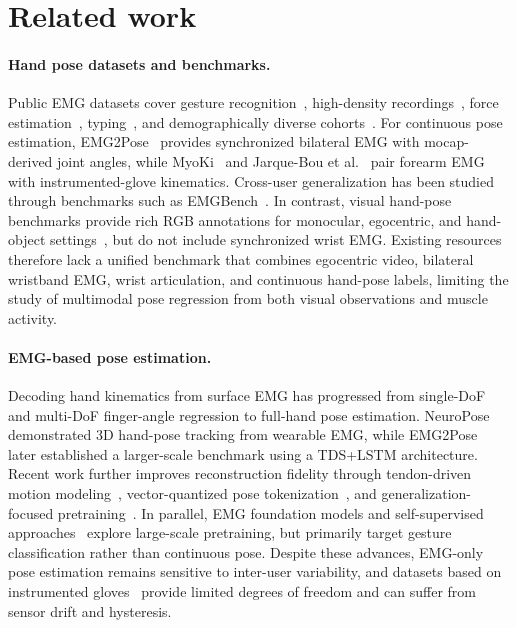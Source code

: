 \documentclass{article}
\begin{document}
\section{Related work}

\paragraph{Hand pose datasets and benchmarks.}
Public EMG datasets cover gesture recognition~\citep{ninapro,grabmyo,putemg,du2017surface,amma2015advancing}, high-density recordings~\citep{jiang2021open}, force estimation~\citep{pimforce}, typing~\citep{emg2qwerty}, and demographically diverse cohorts~\citep{gowda2025database}. For continuous pose estimation, EMG2Pose~\citep{emg2pose} provides synchronized bilateral EMG with mocap-derived joint angles, while MyoKi~\citep{myoki} and Jarque-Bou et al.~\citep{jarque2019} pair forearm EMG with instrumented-glove kinematics. Cross-user generalization has been studied through benchmarks such as EMGBench~\citep{yang2024emgbench}. In contrast, visual hand-pose benchmarks provide rich RGB annotations for monocular, egocentric, and hand-object settings~\citep{freihand,dexycb,interhand,hot3d,h2o,gigahand}, but do not include synchronized wrist EMG. Existing resources therefore lack a unified benchmark that combines egocentric video, bilateral wristband EMG, wrist articulation, and continuous hand-pose labels, limiting the study of multimodal pose regression from both visual observations and muscle activity.

\paragraph{EMG-based pose estimation.}
Decoding hand kinematics from surface EMG has progressed from single-DoF~\citep{ngeo2012continuous,ngeo2014continuous} and multi-DoF finger-angle regression to full-hand pose estimation. NeuroPose~\citep{liu2021neuropose} demonstrated 3D hand-pose tracking from wearable EMG, while EMG2Pose~\citep{emg2pose} later established a larger-scale benchmark using a TDS+LSTM architecture. Recent work further improves reconstruction fidelity through tendon-driven motion modeling~\citep{emg2tendon}, vector-quantized pose tokenization~\citep{vqmyopose}, and generalization-focused pretraining~\citep{zhao2026dexemg}. In parallel, EMG foundation models and self-supervised approaches~\citep{fasulo2025tinymyo,mehlman2025scaling,vicregemg,mast} explore large-scale pretraining, but primarily target gesture classification rather than continuous pose. Despite these advances, EMG-only pose estimation remains sensitive to inter-user variability, and datasets based on instrumented gloves~\citep{myoki,jarque2019} provide limited degrees of freedom and can suffer from sensor drift and hysteresis.
\end{document}
